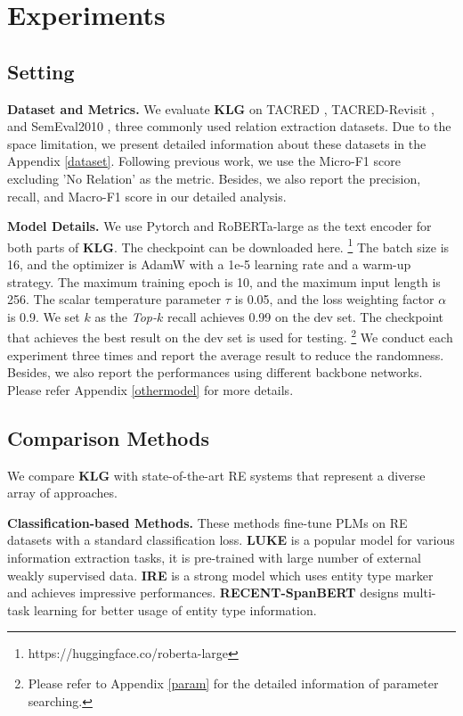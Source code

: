 \section{Experiments}

\subsection{Setting}

\noindent\textbf{Dataset and Metrics.} We evaluate \textbf{KLG} on TACRED \cite{DBLP:conf/emnlp/ZhangZCAM17}, TACRED-Revisit \cite{DBLP:conf/acl/AltGH20a}, and SemEval2010 \cite{DBLP:conf/semeval/HendrickxKKNSPP10}, three commonly used relation extraction datasets. Due to the space limitation, we present detailed information about these datasets in the Appendix \ref{dataset}. Following previous work, we use the Micro-F1 score excluding 'No Relation' as the metric. Besides, we also report the precision, recall, and Macro-F1 score in our detailed analysis.



\noindent\textbf{Model Details.} We use Pytorch \cite{DBLP:conf/nips/PaszkeGMLBCKLGA19} and RoBERTa-large as the text encoder for both parts of \textbf{KLG}. The checkpoint can be downloaded here. \footnote{https://huggingface.co/roberta-large} The batch size is 16, and the optimizer is AdamW \cite{DBLP:conf/iclr/LoshchilovH19} with a 1e-5 learning rate and a warm-up strategy. The maximum training epoch is 10, and the maximum input length is 256. The scalar temperature parameter $\tau$ is 0.05, and the loss weighting factor $\alpha$ is 0.9. We set $k$ as the \textit{Top-$k$} recall achieves 0.99 on the dev set. The checkpoint that achieves the best result on the dev set is used for testing. \footnote{Please refer to Appendix \ref{param} for the detailed information of parameter searching.} We conduct each experiment three times and report the average result to reduce the randomness. Besides, we also report the performances using different backbone networks. Please refer Appendix \ref{othermodel} for more details.

\subsection{Comparison Methods}\label{comparison}

We compare \textbf{KLG} with state-of-the-art RE systems that represent a diverse array of approaches. 

\textbf{Classification-based Methods.} These methods fine-tune PLMs on RE datasets with a standard classification loss. \textbf{LUKE} \cite{DBLP:conf/emnlp/YamadaASTM20} is a popular model for various information extraction tasks, it is pre-trained with large number of external weakly supervised data. \textbf{IRE} \cite{DBLP:journals/corr/abs-2102-01373} is a strong model which uses entity type marker and achieves impressive performances. \textbf{RECENT-SpanBERT} \cite{DBLP:conf/acl/LyuC21} designs multi-task learning for better usage of entity type information.
    

